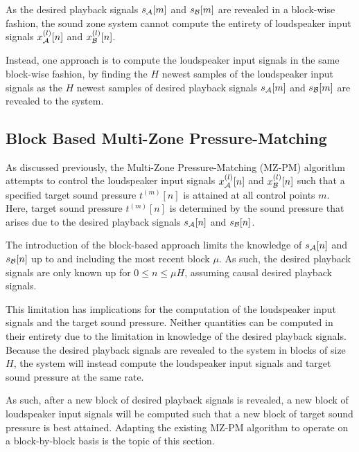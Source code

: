 As the desired playback signals $s_{\mathcal{A}}[m]$ and $s_{\mathcal{B}}[m]$ are revealed in a block-wise fashion, the sound zone system cannot compute the entirety of 
loudspeaker input signals $x^{(l)}_{\mathcal{A}}[n]$ and $x^{(l)}_{\mathcal{B}}[n]$.

Instead, one approach is to compute the loudspeaker input signals in the same block-wise fashion, by finding the $H$ newest samples of the loudspeaker input signals 
as the $H$ newest samples of desired playback signals $s_{\mathcal{A}}[m]$ and $s_{\mathcal{B}}[m]$ are revealed to the system.

\subsection{Block Based Multi-Zone Pressure-Matching}
As discussed previously, the Multi-Zone Pressure-Matching (MZ-PM) algorithm attempts to control the loudspeaker input signals 
$x^{(l)}_{\mathcal{A}}[n]$ and $x^{(l)}_{\mathcal{B}}[n]$ such that a specified target sound pressure $t^{(m)}[n]$ is attained at all control points $m$.
Here, target sound pressure $t^{(m)}[n]$ is determined by the sound pressure that arises due to the 
desired playback signals $s_{\mathcal{A}}[n]$ and $s_{\mathcal{B}}[n]$.

The introduction of the block-based approach limits the knowledge of $s_{\mathcal{A}}[n]$ and $s_{\mathcal{B}}[n]$ up to and including the most recent block $\mu$.
As such, the desired playback signals are only known up for $0 \leq n \leq \mu H$, assuming causal desired playback signals.

This limitation has implications for the computation of the loudspeaker input signals and the target sound pressure.
Neither quantities can be computed in their entirety due to the limitation in knowledge of the desired playback signals.
Because the desired playback signals are revealed to the system in blocks of size $H$, the system will instead compute the loudspeaker input signals and target sound pressure
at the same rate.

As such, after a new block of desired playback signals is revealed, 
a new block of loudspeaker input signals will be computed such that a new block of target sound pressure is best attained.
Adapting the existing MZ-PM algorithm to operate on a block-by-block basis is the topic of this section.

